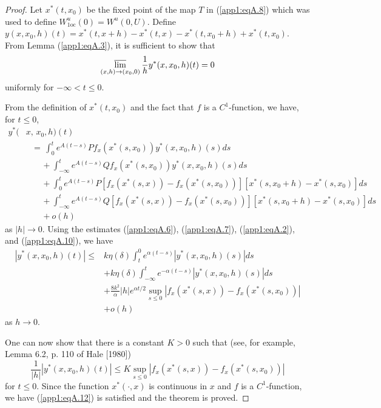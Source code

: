 \documentclass{surv-l}
\theoremstyle{plain}
\theoremstyle{definition}
\numberwithin{equation}{section}
\numberwithin{figure}{chapter}
\begin{document}
\begin{proof}
Let $x^{\ast}(t,x_{0})$ be the fixed point of the map $T$ in (\ref{app1:eqA.8}) which was used to define $W_{\mathrm{1oc}}^{u}(0)=W^{u}(0,U)$. Define $y(x,x_{0},h)(t)=x^{\ast}(t,x+h)-x^{\ast}(t,x)-x^{\ast}(t,x_{0}+h)+x^{\ast}(t,x_{0})$. From Lemma (\ref{app1:eqA.3}), it is sufficient to show that
\begin{equation}\label{app1:eqA.12}
\displaystyle \varlimsup_{(x,h)\rightarrow(x_{0},0)}\frac{1}{h}y^{\ast}(x,x_{0},h)(t)=0
\end{equation}
uniformly for $-\infty<t\leq 0$.

From the definition of $x^{\ast}(t,x_{0})$ and the fact that $f$ is a $C^{1}$-function, we have, for $t\leq 0$,
\begin{align*}
y^{\ast}(&x,\, x_{0}, h)(t)\\
&\,\,\,\,=\,\int_{0}^{t}e^{A(t-s)}Pf_{x}(x^{\ast}(s, x_{0}))y^{\ast}(x, x_{0}, h)(s)ds\\
&\quad\,\,\,\,\,+\int_{-\infty}^{t}e^{A(t-s)}Qf_{x}(x^{\ast}(s, x_{0}))y^{\ast}(x, x_{0}, h)(s)ds\\
&\quad\,\,\,\,\,+\int_{0}^{t}e^{A(t-s)}P[f_{x}(x^{\ast}(s, x))-f_{x}(x^{\ast}(s, x_{0}))][x^{\ast}(s, x_{0}+h)-x^{\ast}(s, x_{0})]ds\\
&\quad\,\,\,\,\,+\int_{-\infty}^{t}e^{A(t-s)}Q[f_{x}(x^{\ast}(s,x))-f_{x}(x^{\ast}(s, x_{0}))][x^{\ast}(s, x_{0}+h)-x^{\ast}(s, x_{0})]ds\\
&\quad\,\,\,\,\,+o(h)
\end{align*}
as $|h|\rightarrow 0$. Using the estimates (\ref{app1:eqA.6}), (\ref{app1:eqA.7}), (\ref{app1:eqA.2}), and (\ref{app1:eqA.10}), we have
\begin{align*}
|y^{\ast}(x, x_{0}, h)(t)|\leq &k\eta(\delta)\int_{t}^{0}e^{\alpha(t-s)}|y^{\ast}(x, x_{0}, h)(s)|ds\\
&+k\eta(\delta)\int_{-\infty}^{t}e^{-\alpha(t-s)}|y^{\ast}(x, x_{0}, h)(s)|ds\\
&+\frac{8k^{2}}{\alpha}|h|e^{\alpha t/2}\displaystyle\sup_{s\leq 0}|f_{x}(x^{\ast}(s, x))-f_{x}(x^{\ast}(s, x_{0}))|\\
&+o(h)
\end{align*}
as $h\rightarrow 0$.

One can now show that there is a constant $K>0$ such that (see, for example, Lemma 6.2, p. 110 of Hale [1980])
\begin{equation*}
\frac{1}{|h|}|y^{\ast}(x, x_{0}, h)(t)|\leq K\displaystyle\sup_{s\leq 0}|f_{x}(x^{\ast}(s, x))-f_{x}(x^{\ast}(s, x_{0}))|
\end{equation*}
for $t\leq 0$. Since the function $x^{\ast}(\cdot, x)$ is continuous in $x$ and $f$ is a $C^{1}$-function, we have (\ref{app1:eqA.12}) is satisfied and the theorem is proved.


\end{proof}
\end{document}
